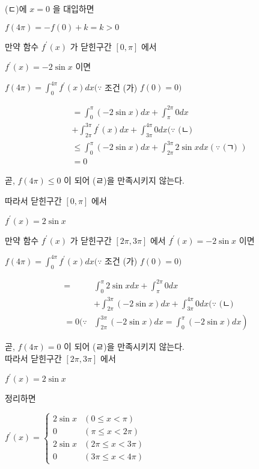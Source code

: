 \documentclass[10pt]{article}
\begin{document}
(ㄷ)에 \(x=0\) 을 대입하면

\(f(4 \pi)=-f(0)+k=k>0\)

만약 함수 \(f^{\prime}(x)\) 가 닫힌구간 \([0, \pi]\) 에서

\(f^{\prime}(x)=-2 \sin x\) 이면

\(f(4 \pi)=\int_{0}^{4 \pi} f^{\prime}(x) d x(\because\) 조건 (가) \(f(0)=0)\)

\[
\begin{aligned}
& =\int_{0}^{\pi}(-2 \sin x) d x+\int_{\pi}^{2 \pi} 0 d x \\
& +\int_{2 \pi}^{3 \pi} f^{\prime}(x) d x+\int_{3 \pi}^{4 \pi} 0 d x(\because \text { (ㄴ) } \\
& \leq \int_{0}^{\pi}(-2 \sin x) d x+\int_{2 \pi}^{3 \pi} 2 \sin x d x(\because \text { (ㄱ) }) \\
& =0
\end{aligned}
\]

곧, \(f(4 \pi) \leq 0\) 이 되어 (ㄹ)을 만족시키지 않는다.

따라서 닫힌구간 \([0, \pi]\) 에서

\(f^{\prime}(x)=2 \sin x\)

만약 함수 \(f^{\prime}(x)\) 가 닫힌구간 \([2 \pi, 3 \pi]\) 에서 \(f^{\prime}(x)=-2 \sin x\) 이면

\(f(4 \pi)=\int_{0}^{4 \pi} f^{\prime}(x) d x(\because\) 조건 (가) \(f(0)=0)\)

\[
\begin{aligned}
= & \int_{0}^{\pi} 2 \sin x d x+\int_{\pi}^{2 \pi} 0 d x \\
& +\int_{2 \pi}^{3 \pi}(-2 \sin x) d x+\int_{3 \pi}^{4 \pi} 0 d x(\because \text { (ㄴ) } \\
=0(\because & \left.\int_{2 \pi}^{3 \pi}(-2 \sin x) d x=\int_{0}^{\pi}(-2 \sin x) d x\right)
\end{aligned}
\]

곧, \(f(4 \pi)=0\) 이 되어 (ㄹ)을 만족시키지 않는다.\\
따라서 닫힌구간 \([2 \pi, 3 \pi]\) 에서

\(f^{\prime}(x)=2 \sin x\)

정리하면

\(f^{\prime}(x)= \begin{cases}2 \sin x & (0 \leq x<\pi) \\ 0 & (\pi \leq x<2 \pi) \\ 2 \sin x & (2 \pi \leq x<3 \pi) \\ 0 & (3 \pi \leq x<4 \pi)\end{cases}\)
\end{document}
